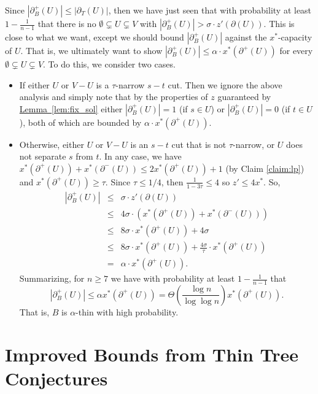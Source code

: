 \documentclass[11pt]{article}
\newcommand{\lref}[2][]{\hyperref[#2]{#1~\ref*{#2}}}
\theoremstyle{definition}
\def\A{{B}}
\newcounter{note}[section]
\begin{document}
Since $|\partial_\A^+(U)| \leq |\partial_{T}(U)|$, then we have just seen that with probability at least $1-\frac{1}{n-1}$ that there is no $\emptyset \subsetneq U \subsetneq V$
with $|\partial_\A^+(U)| > \sigma \cdot z'(\partial(U))$. This is close to what we want, except we should bound $|\partial_\A^+(U)|$ against the $x^*$-capacity of $U$.
That is, we ultimately want to show $|\partial_\A^+(U)| \leq \alpha \cdot x^*(\partial^+(U))$ for every $\emptyset \subsetneq U \subsetneq V$. To do this, we consider two cases.


\begin{itemize}
\item If either $U$ or $V-U$ is a $\tau$-narrow $s-t$ cut. Then we ignore the above analysis and simply note that by the properties of $z$ guaranteed by \lref[Lemma]{lem:fix_sol}
either $|\partial_\A^+(U)| = 1$ (if $s \in U$) or $|\partial_\A^+(U)| = 0$ (if $t \in U$), both of which are bounded by $\alpha \cdot x^*(\partial^+(U))$.
\item Otherwise, either $U$ or $V-U$ is an $s-t$ cut that is not $\tau$-narrow, or $U$ does not separate $s$ from $t$. In any case, we have
$x^*(\partial^+(U)) + x^*(\partial^-(U)) \leq 2 x^*(\partial^+(U)) + 1$ (by Claim \ref{claim:lp}) and $x^*(\partial^+(U)) \geq \tau$.
Since $\tau \leq 1/4$, then $\frac{1}{1-3\tau} \leq 4$ so $z' \leq 4x^*$. So,
\begin{eqnarray*}
|\partial_\A^+(U)| & \leq & \sigma \cdot z'(\partial(U)) \\
& \leq & 4\sigma  \cdot (x^*(\partial^+(U)) + x^*(\partial^-(U))) \\
& \leq & 8\sigma \cdot x^*(\partial^+(U)) + 4\sigma \\
& \leq & 8\sigma \cdot x^*(\partial^+(U)) + \frac{4\sigma}{\tau} \cdot x^*(\partial^+(U)) \\
& = & \alpha \cdot x^*(\partial^+(U)).
\end{eqnarray*}
Summarizing, for $n \geq 7$ we have with probability at least $1-\frac{1}{n-1}$ that
\[ |\partial^+_\A(U)| \leq \alpha x^*(\partial^+(U)) = \Theta \left(\frac{\log n}{\log\log n}\right) x^*(\partial^+(U)).\]
That is, $\A$ is $\alpha$-thin with high probability.

\end{itemize}

\section{Improved Bounds from Thin Tree Conjectures}
\label{sec:thin}
\end{document}
